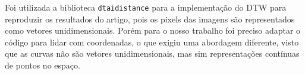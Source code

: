 Foi utilizada a biblioteca \texttt{dtaidistance} \cite{libDTW} para a implementação do DTW para reproduzir os resultados do artigo, pois os pixels das imagens são representados como vetores unidimensionais. Porém para o nosso trabalho foi preciso adaptar o código para lidar com coordenadas, o que exigiu uma abordagem diferente, visto que as curvas não são vetores unidimensionais, mas sim representações contínuas de pontos no espaço.

